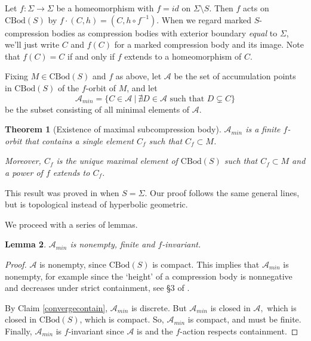 \documentclass[12pt]{amsart}
\newtheorem{theorem}{Theorem}[section] \newtheorem{philosophy}{Statement}[theorem]
\newtheorem{lemma}[theorem]{Lemma}
\theoremstyle{definition}
\theoremstyle{remark}
\newcommand{\CA}{\mathcal A} \newcommand{\CB}{\mathcal B}
\begin{document}
Let $f : \Sigma \longrightarrow \Sigma$ be a homeomorphism with $f=id$ on $\Sigma\setminus S$. Then $f$ acts  on $\mathrm {CBod}(S)$ by $f \cdot (C,h) = (C, h \circ f^{-1})$.  When we regard marked $S$-compression bodies as compression bodies with exterior boundary \emph{equal} to $\Sigma$, we'll just write $C$ and $f(C)$ for a marked compression body and its image. Note that $f(C)=C$ if and only if $f$ extends to a homeomorphism of $C$.

Fixing $M \in \mathrm {CBod}(S)$ and $f$ as above, let
$\mathcal A$ %
be the set of accumulation points in $\mathrm {CBod}(S)$ of the $f$-orbit of $M$, and let 
$$\mathcal A_{min}=\{C\in \CA \ | \ \nexists D \in\CA \text { such that } D \subsetneq C\} $$ be the subset consisting of all minimal elements of $\mathcal A$.  
\begin {theorem}[Existence of maximal subcompression body] \label {maxcompression}
$\mathcal A_{min}$ is a finite $f$-orbit that contains a single element $C_f$ such that $C_f \subset M $.  

Moreover, $C_f$ is the unique maximal element of $\mathrm{CBod}(S)$ such that $C_f \subset M$ and a power of $f $ extends to $C_f$. 
\end {theorem}

This result was proved in \cite {Biringerextending} when $S=\Sigma$.  Our proof follows the same general lines, but is topological instead of hyperbolic geometric.

We proceed with a series of lemmas.

\begin {lemma}\label {lemmaone}
$\mathcal A_{min}$ is nonempty, finite and $f $-invariant.
\end {lemma}
\begin {proof}
$\mathcal A$ is nonempty, since $\mathrm {CBod}(S)$ is compact.  This implies that $\mathcal A_{min}$ is nonempty, for example since the `height' of a compression body is nonnegative and decreases under strict containment, see \S 3 of \cite{Biringerautomorphisms}.

By Claim \ref {convergecontain}, $\mathcal A_{min}$ is discrete.  But $\mathcal A_{min}$ is closed in $\mathcal A, $ which is closed in $\mathrm {CBod}(S) $, which is compact. So, $\mathcal A_{min}$ is compact, and must be finite. Finally, $\mathcal A_{min}$ is $f$-invariant since $\mathcal A$ is and the $f $-action respects containment. 
\end {proof}
\end{document}
